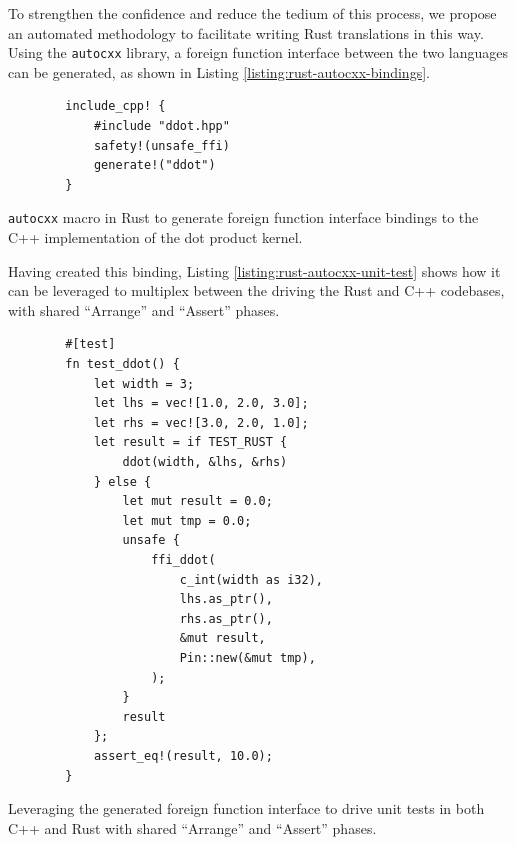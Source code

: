 To strengthen the confidence and reduce the tedium of this process, we propose an automated methodology to facilitate writing Rust translations in this way. Using the \texttt{autocxx} library, a foreign function interface between the two languages can be generated,
as shown in Listing \ref{listing:rust-autocxx-bindings}.

\begin{listing}[H]
    \begin{verbatim}
        include_cpp! {
            #include "ddot.hpp"
            safety!(unsafe_ffi)
            generate!("ddot")
        }
    \end{verbatim}
    \vspace{-0.5cm}
    \caption{\texttt{autocxx} macro in Rust to generate foreign function interface bindings to the C++ implementation of the dot product kernel.}
    \label{listing:rust-autocxx-bindings}
\end{listing}

Having created this binding, Listing \ref{listing:rust-autocxx-unit-test} shows how it can be leveraged to multiplex between the driving the Rust and C++ codebases, with shared ``Arrange'' and ``Assert'' phases.

\begin{code}
    \begin{verbatim}
        #[test]
        fn test_ddot() {
            let width = 3;
            let lhs = vec![1.0, 2.0, 3.0];
            let rhs = vec![3.0, 2.0, 1.0];
            let result = if TEST_RUST {
                ddot(width, &lhs, &rhs)
            } else {
                let mut result = 0.0;
                let mut tmp = 0.0;
                unsafe {
                    ffi_ddot(
                        c_int(width as i32),
                        lhs.as_ptr(),
                        rhs.as_ptr(),
                        &mut result,
                        Pin::new(&mut tmp),
                    );
                }
                result
            };
            assert_eq!(result, 10.0);
        }
    \end{verbatim}
    \caption{Leveraging the generated foreign function interface to drive unit tests in both C++ and Rust with shared ``Arrange'' and ``Assert'' phases.}
    \label{listing:rust-autocxx-unit-test}
\end{code}

